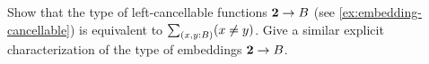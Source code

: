 \begin{ex}\label{ex:cancellable-from-bool}
  Show that the type of left-cancellable functions $\mathbf{2}\to B$ (see \cref{ex:embedding-cancellable}) is equivalent to $\sm{x,y:B}(x\neq y)$.
  Give a similar explicit characterization of the type of embeddings $\mathbf{2}\to B$.
\end{ex}

